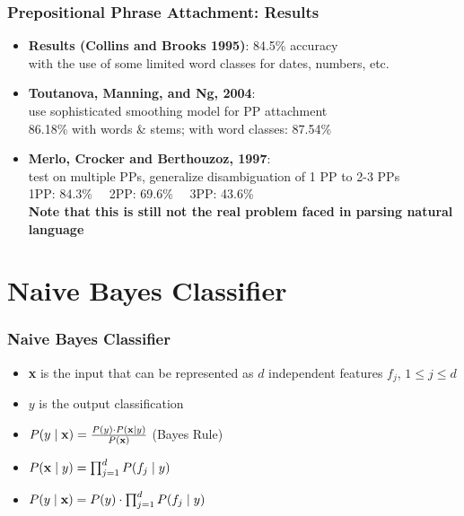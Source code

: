 \begin{frame}
\frametitle{Prepositional Phrase Attachment: Results}
  \begin{itemize}[<+->]
  \item {\bf Results (Collins and Brooks 1995)}: 84.5\% accuracy \\
  with the use of some limited word classes for dates, numbers, etc.
  \item {\bf Toutanova, Manning, and Ng, 2004}: \\
use sophisticated smoothing model for PP attachment\\
86.18\% with words \& stems; with word classes: 87.54\%
  \item {\bf Merlo, Crocker and Berthouzoz, 1997}:\\
 test on multiple PPs, generalize disambiguation of 1 PP to 2-3 PPs\\
1PP: 84.3\% \ \ 2PP: 69.6\% \ \ 3PP: 43.6\% \\
{\bf Note that this is still not the real problem faced in parsing natural language}
  \end{itemize}
\end{frame}


\section{Naive Bayes Classifier}
\frame{\tableofcontents[currentsection]}

\begin{frame}
\frametitle{Naive Bayes Classifier}
\begin{itemize}[<+->]
\item \textbf{x} is the input that can be represented as $d$ independent features $f_j$, $1 \leq j \leq d$
\item $y$ is the output classification
\item $P(y \mid {\bf x}) = \frac{P(y) \cdot P({\bf x} \mid y)}{P({\bf x})}$ (Bayes Rule)
\item $P({\bf x} \mid y) = \prod_{j=1}^{d} P(f_j  \mid y)$
\item $P(y \mid {\bf x}) = P(y) \cdot  \prod_{j=1}^{d} P(f_j  \mid y)$
\end{itemize}
\end{frame}


